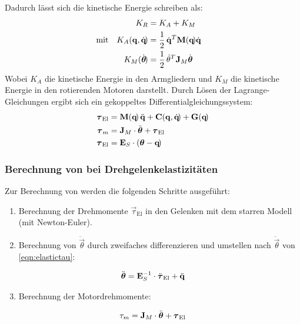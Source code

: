 				Dadurch lässt sich die kinetische Energie schreiben als:
				\begin{align*}
					           &  & K_R                           & = K_A + K_M                                                       &  \\
					\text{mit} &  & K_A(\boldsymbol{\mathrm{q}}, \dot{\boldsymbol{\mathrm{q}}}\!) & = \frac{1}{2} \, \dot{\boldsymbol{\mathrm{q}}}^T \boldsymbol{\mathrm{M}}(\boldsymbol{\mathrm{q}}\!) \dot{\boldsymbol{\mathrm{q}}} &  \\
					           &  & K_M(\dot{\boldsymbol{\mathrm{\theta}}}\!)     & = \frac{1}{2} \, \dot{\theta}^T \boldsymbol{\mathrm{J}}_M \dot{\boldsymbol{\mathrm{\theta}}}      &
				\end{align*}
				Wobei \( K_A \) die kinetische Energie in den Armgliedern und \( K_M \) die kinetische Energie in den rotierenden Motoren darstellt. Durch Lösen der Lagrange-Gleichungen ergibt sich ein gekoppeltes Differentialgleichungssystem:
				\begin{align*}
					\boldsymbol{\mathrm{\tau}}_\text{El} & = \boldsymbol{\mathrm{M}}(\boldsymbol{\mathrm{q}}\!) \, \ddot{\boldsymbol{\mathrm{q}}} + \boldsymbol{\mathrm{C}}(\boldsymbol{\mathrm{q}}, \dot{\boldsymbol{\mathrm{q}}}\!) + \boldsymbol{\mathrm{G}}(\boldsymbol{\mathrm{q}}\!) \\
					\boldsymbol{\mathrm{\tau}}_m         & = \boldsymbol{\mathrm{J}}_M \cdot \ddot{\boldsymbol{\mathrm{\theta}}} + \boldsymbol{\mathrm{\tau}}_\text{El}                                 \\
					\boldsymbol{\mathrm{\tau}}_\text{El} & = \boldsymbol{\mathrm{E}}_S \cdot (\boldsymbol{\mathrm{\theta}} - \boldsymbol{\mathrm{q}}\!)  \label{eqn:elastictau}
				\end{align*}

			\subsubsection{Berechnung von \INVDYN bei Drehgelenkelastizitäten}
				Zur Berechnung von \INVDYN werden die folgenden Schritte ausgeführt:
				\begin{enumerate}
					\item Berechnung der Drehmomente \( \vec{\tau}_\text{El} \) in den Gelenken mit dem starren Modell (\zB mit Newton-Euler).
					\item Berechnung von \( \ddot{\vec{\theta}} \) durch zweifaches differenzieren und umstellen nach \( \ddot{\vec{\theta}} \) von \ref{eqn:elastictau}:
				\end{enumerate}
				\begin{equation*}
					\ddot{\boldsymbol{\mathrm{\theta}}} = \boldsymbol{\mathrm{E}}_S^{-1} \cdot \ddot{\boldsymbol{\mathrm{\tau}}}_\text{El} + \ddot{\boldsymbol{\mathrm{q}}}
				\end{equation*}
				\begin{enumerate}
					\setcounter{enumi}{2}
					\item Berechnung der Motordrehmomente:
				\end{enumerate}
				\begin{equation*}
					\tau_m = \boldsymbol{\mathrm{J}}_M \cdot \ddot{\boldsymbol{\mathrm{\theta}}} + \boldsymbol{\mathrm{\tau}}_\text{El}
				\end{equation*}

